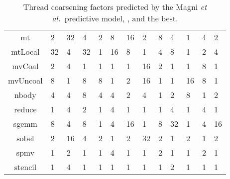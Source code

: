 \begin{table*}
\begin{tabular}{c R{.9cm} R{.9cm} R{.9cm} | R{.9cm} R{.9cm} R{.9cm} | R{.9cm} R{.9cm} R{.9cm} | R{.9cm} R{.9cm} R{.9cm}}
    mt &               2 &                32 &               4 &              2 &                8 &             16 &             2 &               8 &             4 &              1 &                4 &              2 \\
    mtLocal &              32 &                 4 &              32 &              1 &               16 &              8 &             1 &               4 &             8 &              1 &                2 &              4 \\
    mvCoal &               2 &                 4 &               1 &              1 &                1 &              1 &            16 &               2 &             1 &              1 &                8 &              1 \\
    mvUncoal &               8 &                 1 &               8 &              8 &                1 &              2 &            16 &               1 &             1 &             16 &                8 &              1 \\
    nbody &               4 &                 4 &               8 &              4 &                4 &              2 &             4 &               1 &             2 &              8 &                1 &              2 \\
    reduce &               1 &                 4 &               2 &              1 &                4 &              1 &             1 &               1 &             4 &              1 &                4 &              1 \\
    sgemm &               8 &                 4 &               8 &              1 &                4 &             16 &             1 &               8 &            32 &              1 &                4 &             16 \\
    sobel &               2 &                16 &               4 &              2 &                1 &              2 &            32 &               2 &             1 &              2 &                1 &              2 \\
    spmv &               1 &                 2 &               1 &              1 &                4 &              1 &             1 &               2 &             1 &              1 &                2 &              1 \\
    stencil &               1 &                 4 &               1 &              1 &                1 &              1 &             1 &               1 &             2 &              1 &                1 &              1 \\
	\bottomrule
\end{tabular}
\caption{%
	Thread coarsening factors predicted by the Magni \emph{et al.\ }predictive model, \DeepTune, and the best. %
}
\label{tab:pact-results}
\end{table*}
